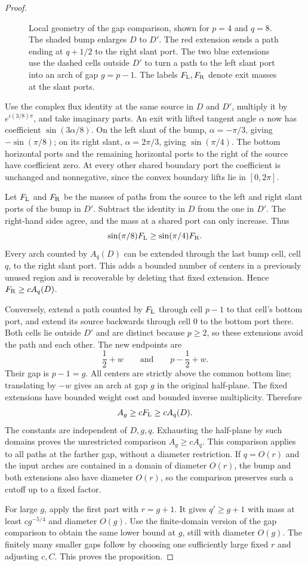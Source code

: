 \documentclass[11pt]{article}
\numberwithin{equation}{section}
\theoremstyle{definition}\newtheorem{definition}[theorem]{Definition}
\theoremstyle{remark}\newtheorem{remark}[theorem]{Remark}
\begin{document}
\begin{proof}
\begin{figure}[htbp]
\caption{Local geometry of the gap comparison, shown for $p=4$ and $q=8$.
The shaded bump enlarges $D$ to $D'$. The red extension sends a path
ending at $q+1/2$ to the right slant port. The two blue extensions use
the dashed cells outside $D'$ to turn a path to the left slant port
into an arch of gap $g=p-1$. The labels $F_{\rm L},F_{\rm R}$ denote
exit masses at the slant ports.}\label{L:fig:cap-comparison}
\end{figure}

Use the complex flux identity at the same source in $D$ and $D'$,
multiply it by $e^{i(3/8)\pi}$, and take imaginary parts.  An exit
with lifted tangent angle $\alpha$ now has coefficient
$\sin(3\alpha/8)$.  On the left slant of the bump,
$\alpha=-\pi/3$, giving $-\sin(\pi/8)$; on its right slant,
$\alpha=2\pi/3$, giving $\sin(\pi/4)$.  The bottom horizontal
ports and the remaining horizontal ports to the right of the source
have coefficient zero.  At every other shared boundary port the
coefficient is unchanged and nonnegative, since the convex boundary
lifts lie in $[0,2\pi]$.

Let $F_{\rm L}$ and $F_{\rm R}$ be the masses of paths from the
source to the left and right slant ports of the bump in $D'$.
Subtract the identity in $D$ from the one in $D'$.  The right-hand
sides agree, and the mass at a shared port can only increase.  Thus
\[
 \sin(\pi/8)F_{\rm L}\ge\sin(\pi/4)F_{\rm R}.
\]
Every arch counted by $A_q(D)$ can be extended through the last bump
cell, cell $q$, to the right slant port.  This adds a bounded number
of centers in a previously unused region and is recoverable by
deleting that fixed extension.  Hence $F_{\rm R}\ge cA_q(D)$.

Conversely, extend a path counted by $F_{\rm L}$ through cell $p-1$
to that cell's bottom port, and extend its source backwards through
cell $0$ to the bottom port there.  Both cells lie outside $D'$ and
are distinct because $p\ge2$, so these extensions avoid the path
and each other.  The new endpoints are
\[
 \frac12+w\qquad\text{and}\qquad p-\frac12+w.
\]
Their gap is $p-1=g$.  All centers are strictly above the common
bottom line; translating by $-w$ gives an arch at gap $g$ in the
original half-plane.  The fixed extensions have bounded weight cost
and bounded inverse multiplicity.  Therefore
\[
 A_g\ge cF_{\rm L}\ge cA_q(D).
\]
The constants are independent of $D,g,q$.  Exhausting the half-plane
by such domains proves the unrestricted comparison $A_g\ge cA_q$.
This comparison applies to all paths at the farther gap, without a
diameter restriction.  If $q=O(r)$ and the input arches are contained
in a domain of diameter $O(r)$, the bump and both extensions also
have diameter $O(r)$, so the comparison preserves such a cutoff up
to a fixed factor.

For large $g$, apply the first part with $r=g+1$.  It gives
$q'\ge g+1$ with mass at least $cg^{-5/4}$ and diameter $O(g)$.
Use the finite-domain version of the gap comparison to obtain the
same lower bound at $g$, still with diameter $O(g)$.  The finitely
many smaller gaps follow by choosing one sufficiently large fixed
$r$ and adjusting $c,C$.  This proves the proposition.
\end{proof}
\end{document}
